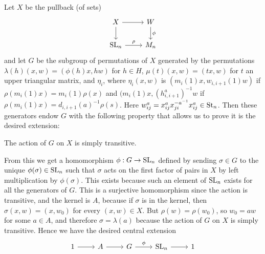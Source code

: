 Let $X$ be the pullback (of sets)
\[
    \begin{tikzcd}
        \arrow[from=1-1, to=1-2]
        \arrow[from=1-1, to=2-1]
        \arrow["{\phi}", from=1-2, to=2-2]
        \arrow["{\rho}", from=2-1, to=2-2]
        X & W \\
        \SL_n & M_n
    \end{tikzcd}
\]
and let $G$ be the subgroup of permutations of $X$ generated by the permutations $\lambda(h)(x, w) = (\phi(h)x, hw)$ for $h \in H$, $\mu(t)(x, w) = (tx, w)$ for $t$ an upper triangular matrix, and $\eta_i$, where $\eta_i(x, w)$ is $(m_i(1)x, w_{i, i+1}(1)w)$ if $\rho(m_i(1)x) = m_i(1)\rho(x)$ and $(m_i(1)x, (h_{i, i + 1}^a)^{-1}w$ if $\rho(m_i(1)x) = d_{i, i+1}(a)^{-1} \rho(s)$. Here $w_{ij}^a = x_{ij}^a x_{ji}^{-a^{-1}} x_{ij}^a \in \mathrm{St}_n$. Then these generators endow $G$ with the following property that allows us to prove it is the desired extension:
\begin{lemma}
    The action of $G$ on $X$ is simply transitive.
\end{lemma}
From this we get a homomorphism $\phi : G \to \mathrm{SL}_n$ defined by sending $\sigma \in G$ to the unique $\phi(\sigma) \in \mathrm{SL}_n$ such that $\sigma$ acts on the first factor of pairs in $X$ by left multiplication by $\phi(\sigma)$. This exists because such an element of $\mathrm{SL}_n$ exists for all the generators of $G$. This is a surjective homomorphism since the action is transitive, and the kernel is $A$, because if $\sigma$ is in the kernel, then $\sigma(x, w) = (x, w_0)$ for every $(x, w) \in X$. But $\rho(w) = \rho(w_0)$, so $w_0 = aw$ for some $a \in A$, and therefore $\sigma = \lambda(a)$ because the action of $G$ on $X$ is simply transitive. Hence we have the desired central extension
\[
    \begin{tikzcd}
        \arrow[from=1-1, to=1-2]
        \arrow[from=1-2, to=1-3]
        \arrow["{\phi}", from=1-3, to=1-4]
        \arrow[from=1-4, to=1-5]
        1 & A & G & \SL_n & 1
    \end{tikzcd}
\]

